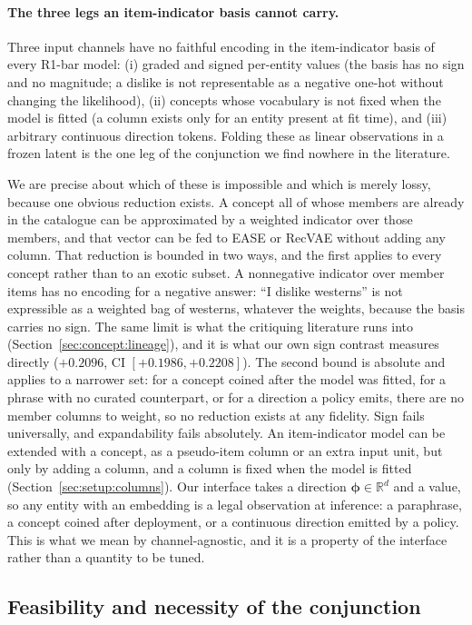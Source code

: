 \documentclass[manuscript,screen]{acmart}
\newcommand{\R}{\mathbb{R}}
\newcommand{\bphi}{\boldsymbol{\phi}}
\begin{document}
\paragraph{The three legs an item-indicator basis cannot carry.}
Three input channels have no faithful encoding in the item-indicator basis of every R1-bar model: (i) graded and signed per-entity values (the basis has no sign and no magnitude; a dislike is not representable as a negative one-hot without changing the likelihood), (ii) concepts whose vocabulary is not fixed when the model is fitted (a column exists only for an entity present at fit time), and (iii) arbitrary continuous direction tokens. Folding these as linear observations in a frozen latent is the one leg of the conjunction we find nowhere in the literature.

We are precise about which of these is impossible and which is merely lossy, because one obvious reduction exists. A concept all of whose members are already in the catalogue can be approximated by a weighted indicator over those members, and that vector can be fed to EASE or RecVAE without adding any column. That reduction is bounded in two ways, and the first applies to every concept rather than to an exotic subset. A nonnegative indicator over member items has no encoding for a negative answer: ``I dislike westerns'' is not expressible as a weighted bag of westerns, whatever the weights, because the basis carries no sign. The same limit is what the critiquing literature runs into (Section~\ref{sec:concept:lineage}), and it is what our own sign contrast measures directly ($+0.2096$, CI $[+0.1986,+0.2208]$). The second bound is absolute and applies to a narrower set: for a concept coined after the model was fitted, for a phrase with no curated counterpart, or for a direction a policy emits, there are no member columns to weight, so no reduction exists at any fidelity. Sign fails universally, and expandability fails absolutely. An item-indicator model can be extended with a concept, as a pseudo-item column or an extra input unit, but only by adding a column, and a column is fixed when the model is fitted (Section~\ref{sec:setup:columns}). Our interface takes a direction $\bphi\in\R^{d}$ and a value, so any entity with an embedding is a legal observation at inference: a paraphrase, a concept coined after deployment, or a continuous direction emitted by a policy. This is what we mean by channel-agnostic, and it is a property of the interface rather than a quantity to be tuned.

\subsection{Feasibility and necessity of the conjunction}\label{sec:gap:why}
\end{document}
